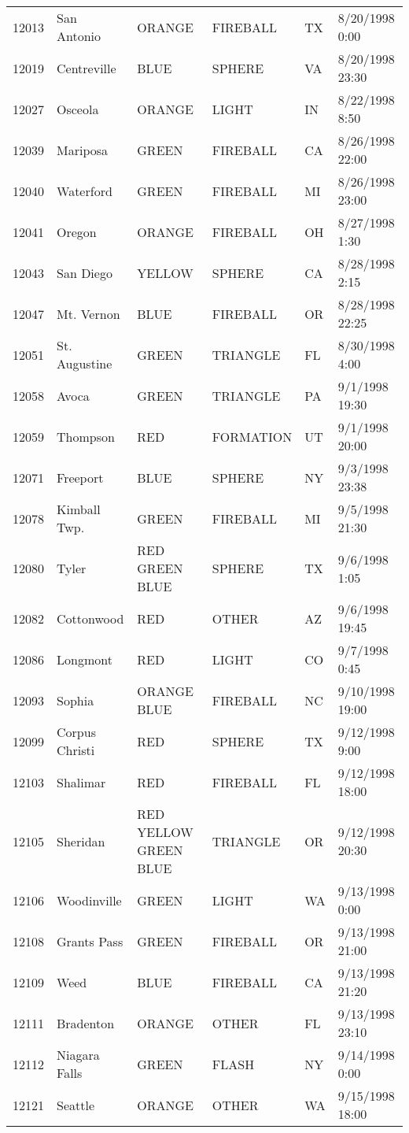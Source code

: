 \begin{tabular}{llllll}
12013 & San Antonio & ORANGE & FIREBALL & TX & 8/20/1998 0:00 \\
12019 & Centreville & BLUE & SPHERE & VA & 8/20/1998 23:30 \\
12027 & Osceola & ORANGE & LIGHT & IN & 8/22/1998 8:50 \\
12039 & Mariposa & GREEN & FIREBALL & CA & 8/26/1998 22:00 \\
12040 & Waterford & GREEN & FIREBALL & MI & 8/26/1998 23:00 \\
12041 & Oregon & ORANGE & FIREBALL & OH & 8/27/1998 1:30 \\
12043 & San Diego & YELLOW & SPHERE & CA & 8/28/1998 2:15 \\
12047 & Mt. Vernon & BLUE & FIREBALL & OR & 8/28/1998 22:25 \\
12051 & St. Augustine & GREEN & TRIANGLE & FL & 8/30/1998 4:00 \\
12058 & Avoca & GREEN & TRIANGLE & PA & 9/1/1998 19:30 \\
12059 & Thompson & RED & FORMATION & UT & 9/1/1998 20:00 \\
12071 & Freeport & BLUE & SPHERE & NY & 9/3/1998 23:38 \\
12078 & Kimball Twp. & GREEN & FIREBALL & MI & 9/5/1998 21:30 \\
12080 & Tyler & RED GREEN BLUE & SPHERE & TX & 9/6/1998 1:05 \\
12082 & Cottonwood & RED & OTHER & AZ & 9/6/1998 19:45 \\
12086 & Longmont & RED & LIGHT & CO & 9/7/1998 0:45 \\
12093 & Sophia & ORANGE BLUE & FIREBALL & NC & 9/10/1998 19:00 \\
12099 & Corpus Christi & RED & SPHERE & TX & 9/12/1998 9:00 \\
12103 & Shalimar & RED & FIREBALL & FL & 9/12/1998 18:00 \\
12105 & Sheridan & RED YELLOW GREEN BLUE & TRIANGLE & OR & 9/12/1998 20:30 \\
12106 & Woodinville & GREEN & LIGHT & WA & 9/13/1998 0:00 \\
12108 & Grants Pass & GREEN & FIREBALL & OR & 9/13/1998 21:00 \\
12109 & Weed & BLUE & FIREBALL & CA & 9/13/1998 21:20 \\
12111 & Bradenton & ORANGE & OTHER & FL & 9/13/1998 23:10 \\
12112 & Niagara Falls & GREEN & FLASH & NY & 9/14/1998 0:00 \\
12121 & Seattle & ORANGE & OTHER & WA & 9/15/1998 18:00 \\

\end{tabular}

